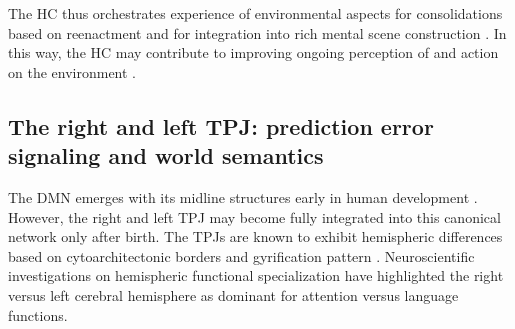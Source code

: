 \documentclass[10pt,letterpaper]{article}
\begin{document}
The HC thus orchestrates experience of environmental aspects for
consolidations based on reenactment and for integration into
rich mental scene construction \citep{deuker2016event, bird2010establishing}.
In this way, the HC may contribute to improving
ongoing perception of and action on the environment
\citep{maguire2016}.


\subsection{The right and left TPJ: prediction error signaling and world semantics}
The DMN emerges with its midline structures early in human development
\citep{doria2010}.
However,
the right and left TPJ may become fully integrated into this canonical
network only after birth.
The TPJs are known to exhibit hemispheric differences
based on cytoarchitectonic borders and gyrification pattern
\citep{seghier2013angular}.
Neuroscientific investigations on hemispheric functional specialization
have highlighted the right versus left cerebral hemisphere as dominant for
attention versus language functions.
\end{document}
